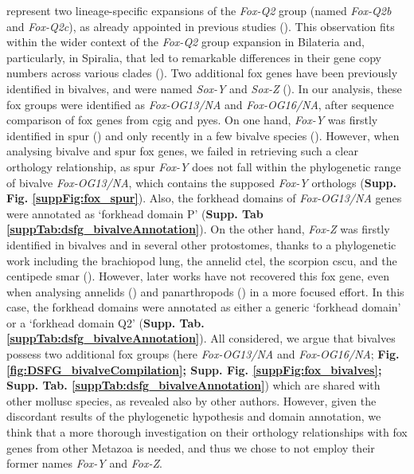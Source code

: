 \documentclass[../main.tex]{subfiles}
\begin{document}
represent two lineage-specific expansions of the \textit{Fox-Q2} group (named \textit{Fox-Q2b} and \textit{Fox-Q2c}), as already appointed in previous studies (\textbf{\cite{yang2014phylogeny, wu2020identification}}). This observation fits within the wider context of the \textit{Fox-Q2} group expansion in Bilateria and, particularly, in Spiralia, that led to remarkable differences in their gene copy numbers across various clades (\textbf{\cite{seudre2022fox}}). Two additional \gls{fox} genes have been previously identified in bivalves, and were named \textit{Sox-Y} and \textit{Sox-Z} (\textbf{\cite{yang2014phylogeny, wu2020identification}}). In our analysis, these \gls{fox} groups were identified as \textit{Fox-OG13/NA} and \textit{Fox-OG16/NA}, after sequence comparison of \gls{fox} genes from \gls{cgig} and \gls{pyes}. On one hand, \textit{Fox-Y} was firstly identified in \gls{spur} (\textbf{\cite{tu2006sea}}) and only recently in a few bivalve species (\textbf{\cite{yang2014phylogeny, wu2020identification}}). However, when analysing bivalve and \gls{spur} \gls{fox} genes, we failed in retrieving such a clear orthology relationship, as \gls{spur} \textit{Fox-Y} does not fall within the phylogenetic range of bivalve \textit{Fox-OG13/NA}, which contains the supposed \textit{Fox-Y} orthologs (\textbf{Supp. Fig. \ref{suppFig:fox_spur}}). Also, the forkhead domains of \textit{Fox-OG13/NA} genes were annotated as ‘forkhead domain P’ (\textbf{Supp. Tab \ref{suppTab:dsfg_bivalveAnnotation}}). On the other hand, \textit{Fox-Z} was firstly identified in bivalves and in several other protostomes, thanks to a phylogenetic work including the brachiopod \gls{lung}, the annelid \gls{ctel}, the scorpion \gls{cscu}, and the centipede \gls{smar} (\textbf{\cite{wu2020identification}}). However, later works have not recovered this \gls{fox} gene, even when analysing annelids (\textbf{\cite{seudre2022fox}}) and panarthropods (\textbf{\cite{schomburg2022phylogenetic}}) in a more focused effort. In this case, the forkhead domains were annotated as either a generic ‘forkhead domain’ or a ‘forkhead domain Q2’ (\textbf{Supp. Tab. \ref{suppTab:dsfg_bivalveAnnotation}}). All considered, we argue that bivalves possess two additional \gls{fox} groups (here \textit{Fox-OG13/NA} and \textit{Fox-OG16/NA}; \textbf{Fig. \ref{fig:DSFG_bivalveCompilation}; Supp. Fig. \ref{suppFig:fox_bivalves}; Supp. Tab. \ref{suppTab:dsfg_bivalveAnnotation}}) which are shared with other mollusc species, as revealed also by other authors. However, given the discordant results of the phylogenetic hypothesis and domain annotation, we think that a more thorough investigation on their orthology relationships with \gls{fox} genes from other Metazoa is needed, and thus we chose to not employ their former names \textit{Fox-Y} and \textit{Fox-Z}.
\end{document}

